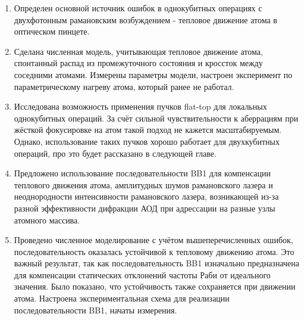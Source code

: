\begin{enumerate}
	\item Определен основной источник ошибок в однокубитных операциях с двухфотонным рамановским возбуждением - тепловое движение атома в оптическом пинцете.
	\item Сделана численная модель, учитывающая тепловое движение атома, спонтанный распад из промежуточного состояния и кроссток между соседними атомами. Измерены параметры модели, настроен эксперимент по параметрическому нагреву атома, который ранее не работал.
	\item Исследована возможность применения пучков flat-top для локальных однокубитных операций. За счёт сильной чувствительности к аберрациям при жёсткой фокусировке на атом такой подход не кажется масштабируемым. Однако, использование таких пучков хорошо работает для двухкубитных операций, про это будет рассказано в следующей главе.
	\item Предложено использование последовательности BB1 для компенсации теплового движения атома, амплитудных шумов рамановского лазера и неоднородности интенсивности рамановского лазера, возникающей из-за разной эффективности дифракции АОД при адрессации на разные узлы атомного массива. 
	\item Проведено численное моделирование с учётом вышеперечисленных ошибок, последовательность оказалась устойчивой к тепловому движению атома. Это важный результат, так как последовательность BB1 изначально предназначена для компенсации статических отклонений частоты Раби от идеального значения. Было показано, что устойчивость также сохраняется при движении атома. Настроена экспериментальная схема для реализации последовательности BB1, начаты измерения.
\end{enumerate}

\newpage